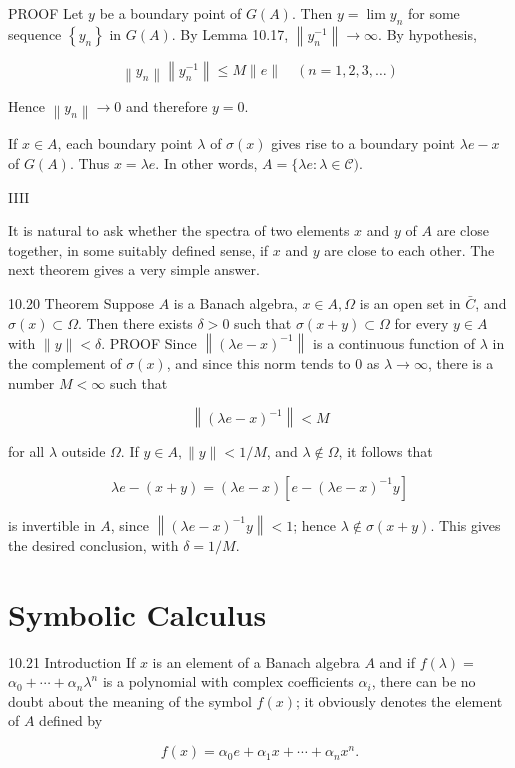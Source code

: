 \documentclass[10pt]{article}
\begin{document}
PROOF Let $y$ be a boundary point of $G(A)$. Then $y=\lim y_{n}$ for some sequence $\left\{y_{n}\right\}$ in $G(A)$. By Lemma 10.17, $\left\|y_{n}^{-1}\right\| \rightarrow \infty$. By hypothesis,

$$
\left\|y_{n}\right\|\left\|y_{n}^{-1}\right\| \leqslant M\|e\| \quad(n=1,2,3, \ldots)
$$

Hence $\left\|y_{n}\right\| \rightarrow 0$ and therefore $y=0$.

If $x \in A$, each boundary point $\lambda$ of $\sigma(x)$ gives rise to a boundary point $\lambda e-x$ of $G(A)$. Thus $x=\lambda e$. In other words, $A=\{\lambda e: \lambda \in \mathscr{C})$.

IIII

It is natural to ask whether the spectra of two elements $x$ and $y$ of $A$ are close together, in some suitably defined sense, if $x$ and $y$ are close to each other. The next theorem gives a very simple answer.

10.20 Theorem Suppose $A$ is a Banach algebra, $x \in A, \Omega$ is an open set in $\bar{C}$, and $\sigma(x) \subset \Omega$. Then there exists $\delta>0$ such that $\sigma(x+y) \subset \Omega$ for every $y \in A$ with $\|y\|<\delta$. PROOF Since $\left\|(\lambda e-x)^{-1}\right\|$ is a continuous function of $\lambda$ in the complement of $\sigma(x)$, and since this norm tends to 0 as $\lambda \rightarrow \infty$, there is a number $M<\infty$ such that

$$
\left\|(\lambda e-x)^{-1}\right\|<M
$$

for all $\lambda$ outside $\Omega$. If $y \in A,\|y\|<1 / M$, and $\lambda \notin \Omega$, it follows that

$$
\lambda e-(x+y)=(\lambda e-x)\left[e-(\lambda e-x)^{-1} y\right]
$$

is invertible in $A$, since $\left\|(\lambda e-x)^{-1} y\right\|<1$; hence $\lambda \notin \sigma(x+y)$. This gives the desired conclusion, with $\delta=1 / M$.

\section{Symbolic Calculus}
10.21 Introduction If $x$ is an element of a Banach algebra $A$ and if $f(\lambda)=$ $\alpha_{0}+\cdots+\alpha_{n} \lambda^{n}$ is a polynomial with complex coefficients $\alpha_{i}$, there can be no doubt about the meaning of the symbol $f(x)$; it obviously denotes the element of $A$ defined by

$$
f(x)=\alpha_{0} e+\alpha_{1} x+\cdots+\alpha_{n} x^{n} .
$$
\end{document}
